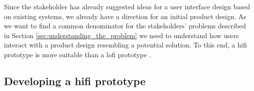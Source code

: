 Since the stakeholder has already suggested ideas for a user interface design based on existing systems, we already have a direction for an initial product design. 
As we want to find a common denominator for the stakeholders' problems described in Section \ref{sec:understanding_the_problem} we need to understand how users interact with a product design resembling a potential solution.
To this end, a hifi prototype is more suitable than a lofi prototype \cite{low-vs-high-fidelity-prototype}.

\subsection{Developing a hifi prototype}
